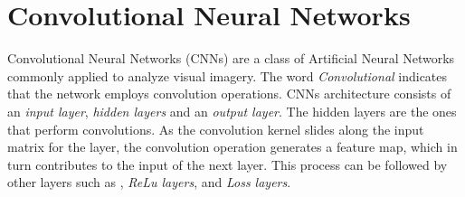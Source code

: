 \documentclass{standalone}
\begin{document}
\section{Convolutional Neural Networks}
Convolutional Neural Networks (CNNs) are a class of Artificial Neural Networks commonly applied to analyze visual imagery\cite{wiki:cnn, CNN}.
The word \textit{Convolutional} indicates that the network employs convolution operations.
CNNs architecture consists of an \textit{input layer}, \textit{hidden layers} and an \textit{output layer}.
The hidden layers are the ones that perform convolutions.
As the convolution kernel slides along the input matrix for the layer, the convolution operation generates a feature map, which in turn contributes to the input of the next layer\cite{wiki:cnn, CNN}.
This process can be followed by other layers such as , \textit{ReLu layers}, and \textit{Loss layers}.
\end{document}
